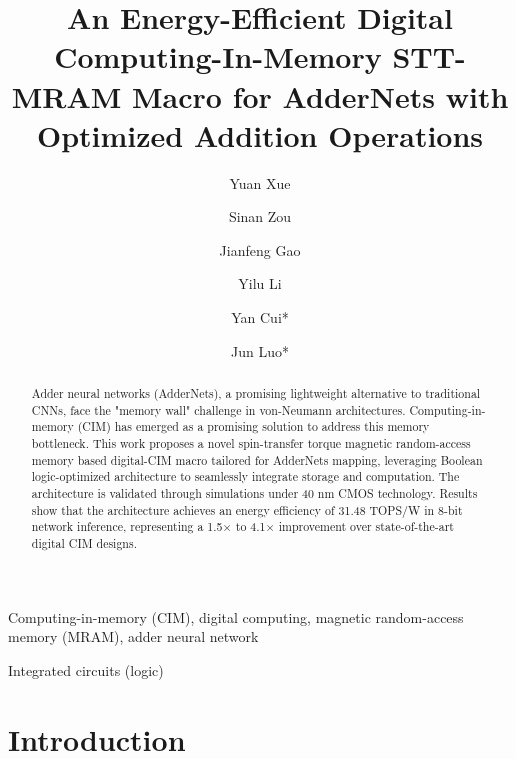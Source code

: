 \documentclass[submit]{elex2024}%
\title{An Energy-Efficient Digital Computing-In-Memory STT-MRAM Macro for AdderNets with Optimized Addition Operations}
\author{Yuan Xue}{1,2,3}[xueyuan@ime.ac.cn]
\author{Sinan Zou}{1,2,3}[zousinan@ime.ac.cn]
\author{Jianfeng Gao}{1,2}[gaojianfegn@ime.ac.cn]
\author{Yilu Li}{1,2}[liyilu@ime.ac.cn]<2481216>%
\author{Yan Cui*}{1,2}[cuiyan@ime.ac.cn]
\author{Jun Luo*}{1,2,3}[luojun@ime.ac.cn]
\begin{document}
\maketitle 

\begin{abstract}
Adder neural networks (AdderNets), a promising lightweight alternative to traditional CNNs, face the "memory wall" challenge in von-Neumann architectures. Computing-in-memory (CIM) has emerged as a promising solution to address this memory bottleneck. This work proposes a novel spin-transfer torque magnetic random-access memory based digital-CIM macro tailored for AdderNets mapping, leveraging Boolean logic-optimized architecture to seamlessly integrate storage and computation. The architecture is validated through simulations under 40 nm CMOS technology. Results show that the architecture achieves an energy efficiency of 31.48 TOPS/W in 8-bit network inference, representing a 1.5$\times$ to 4.1$\times$ improvement over state-of-the-art digital CIM designs.
\end{abstract}

\begin{keywords}
Computing-in-memory (CIM), digital computing, magnetic random-access memory (MRAM), adder neural network
\end{keywords}

\begin{classification}
Integrated circuits (logic)
\end{classification}


\section{Introduction}
\end{document}
